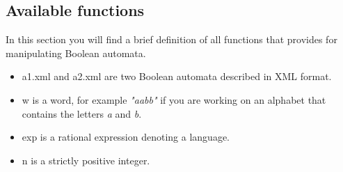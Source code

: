 \subsection{Available functions}
In this section you will find a brief definition of all functions that
\Vauc provides for manipulating Boolean automata.
\begin{itemize}
\item a1.xml and a2.xml are two Boolean automata described in
  \Vauc XML format.
\item w is a word, for example \textit{"aabb"} if you are working on an
  alphabet that contains the letters \textit{a} and \textit{b}.
\item exp is a rational expression denoting a language.
\item n is a strictly positive integer.
\end{itemize}


